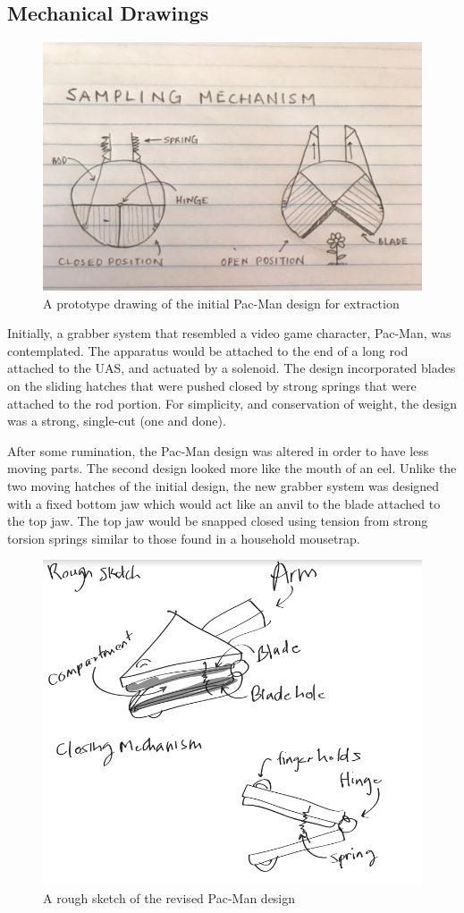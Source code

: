 \documentclass{wrcecapstone}
\begin{document}
\subsection{Mechanical Drawings}

\begin{figure}
\begin{center}
\includegraphics[width=0.8\columnwidth]{figures/fig731.jpg}
\end{center}
\caption{A prototype drawing of the initial Pac-Man design for extraction}
\label{fig:7.3.1}
\end{figure}
Initially, a grabber system that resembled a video game character, Pac-Man, was contemplated.  The apparatus would be attached to the end of a long rod attached to the UAS, and actuated by a solenoid.  The design incorporated blades on the sliding hatches that were pushed closed by strong springs that were attached to the rod portion.  For simplicity, and conservation of weight, the design was a strong, single-cut (one and done). 

After some rumination, the Pac-Man design was altered in order to have less moving parts.  The second design looked more like the mouth of an eel.  Unlike the two moving hatches of the initial design, the new grabber system was designed with a fixed bottom jaw which would act like an anvil to the blade attached to the top jaw.  The top jaw would be snapped closed using tension from strong torsion springs similar to those found in a household mousetrap.
\begin{figure}
\begin{center}
\includegraphics[width=0.6\columnwidth]{figures/fig732.png}
\end{center}
\caption{A rough sketch of the revised Pac-Man design}
\label{fig:7.3.2}
\end{figure}
\end{document}
